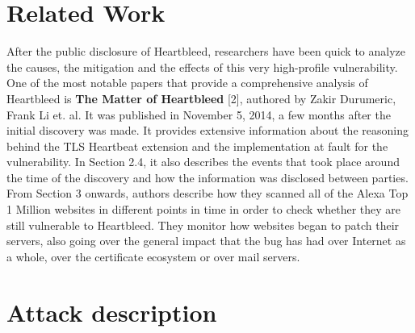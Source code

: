\documentclass[12pt,a4paper,english,onecolumn]{IEEEtran}
\begin{document}
\vspace{10px}

\section{Related Work}

After the public disclosure of Heartbleed, researchers have been quick to analyze the causes, the mitigation and the effects of this very high-profile vulnerability. One of the most notable papers that provide a comprehensive analysis of Heartbleed is \textbf{The Matter of Heartbleed} [2], authored by Zakir Durumeric, Frank Li et. al. It was published in November 5, 2014, a few months after the initial discovery was made. It provides extensive information about the reasoning behind the TLS Heartbeat extension and the implementation at fault for the vulnerability. In Section 2.4, it also describes the events that took place around the time of the discovery and how the information was disclosed between parties. From Section 3 onwards, authors describe how they scanned all of the Alexa Top 1 Million websites in different points in time in order to check whether they are still vulnerable to Heartbleed. They monitor how websites began to patch their servers, also going over the general impact that the bug has had over Internet as a whole, over the certificate ecosystem or over mail servers.


 \section{Attack description}
\end{document}
